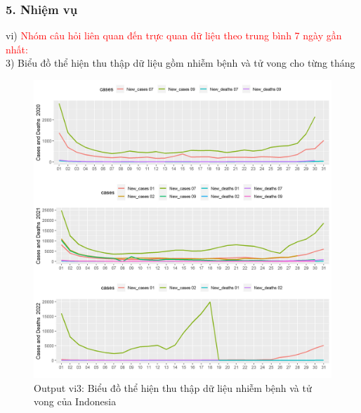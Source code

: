 \documentclass[english,10pt,table]{beamer}
\begin{document}
\begin{frame}[fragile]
\frametitle{5.  Nhiệm vụ}
vi) \textcolor{red}{Nhóm câu hỏi liên quan đến trực quan dữ liệu theo trung bình 7 ngày gần nhất:}\\
    3) Biểu đồ thể hiện thu thập dữ liệu gồm nhiễm bệnh và tử vong cho từng tháng
	\begin{figure}[h!]
	\begin{center}
		    \includegraphics[scale = 0.26]{Images/VI/vi3 Indonesia .jpeg}
		     \caption{Output vi3: Biểu đồ thể hiện thu thập dữ liệu nhiễm bệnh và tử vong của Indonesia}
		\end{center}
		\end{figure}
\end{frame}
\end{document}
